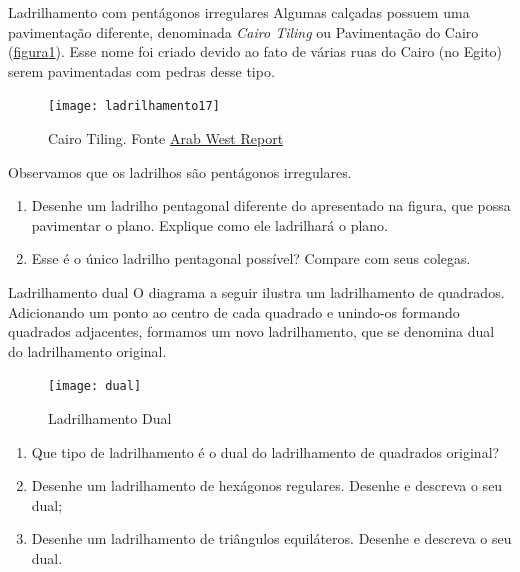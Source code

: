 \begin{task}{Ladrilhamento com pentágonos irregulares}
Algumas calçadas possuem uma pavimentação diferente, denominada \textit{Cairo Tiling} ou Pavimentação do Cairo (\hyperref[cairo]{figura\ref{cairo}}). Esse nome foi criado devido ao fato de várias ruas do Cairo (no Egito) serem pavimentadas com pedras desse tipo.

	\begin{figure}[H]
	\centering
	\texttt{[image: ladrilhamento17]}
	\label{cairo}
	\caption{Cairo Tiling. Fonte \href{encurtador.com.br/eksyU}{Arab West Report}}
	\end{figure}

Observamos que os ladrilhos são pentágonos irregulares.

	\begin{enumerate}
		\item Desenhe um ladrilho pentagonal diferente do apresentado na figura, que possa pavimentar o plano. Explique como ele ladrilhará o plano.
		\item Esse é o único ladrilho pentagonal possível? Compare com seus colegas.
	\end{enumerate}

\end{task}



\begin{task}{Ladrilhamento dual}
O diagrama a seguir ilustra um ladrilhamento de quadrados. Adicionando um ponto ao centro de cada quadrado e unindo-os formando quadrados adjacentes, formamos um novo ladrilhamento, que se denomina dual do ladrilhamento original.

	\begin{figure}[H]
	\centering
	\texttt{[image: dual]}
	\caption{Ladrilhamento Dual}
	\end{figure}

	\begin{enumerate}
		\item Que tipo de ladrilhamento é o dual do ladrilhamento de quadrados original?
		\item Desenhe um ladrilhamento de hexágonos regulares. Desenhe e descreva o seu dual;
		\item Desenhe um ladrilhamento de triângulos equiláteros. Desenhe e descreva o seu dual.
	\end{enumerate}

\end{task}



